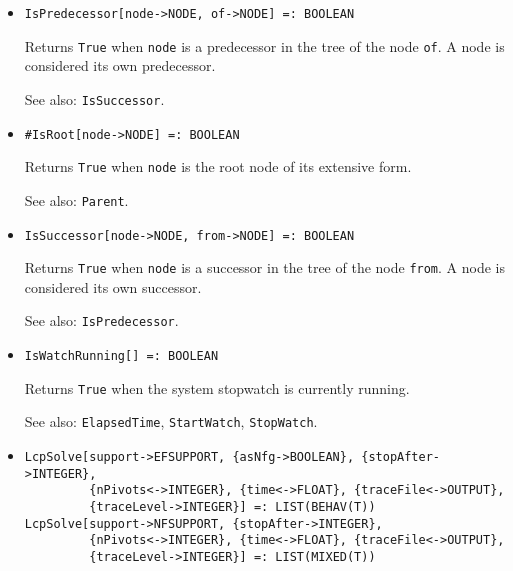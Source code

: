 \begin{itemize}
\item
\protect \large \begin{verbatim}
IsPredecessor[node->NODE, of->NODE] =: BOOLEAN
\end{verbatim}\normalsize

\bd
Returns \verb+True+ when \verb+node+ is a predecessor
in the tree of the node \verb+of+.  A node is considered its own predecessor.
\item [See also:] \verb+IsSuccessor+.
\ed

\item
\protect \large \begin{verbatim}
#IsRoot[node->NODE] =: BOOLEAN
\end{verbatim}\normalsize

\bd
Returns \verb+True+ when \verb+node+ is the root node of its
extensive form.
\item [See also:] \verb+Parent+.
\ed

\item
\protect \large \begin{verbatim}
IsSuccessor[node->NODE, from->NODE] =: BOOLEAN
\end{verbatim}\normalsize

\bd
Returns \verb+True+ when \verb+node+ is a successor
in the tree of the node \verb+from+.  A node is considered its own successor.
\item [See also:] \verb+IsPredecessor+.
\ed

\item
\protect \large \begin{verbatim}
IsWatchRunning[] =: BOOLEAN
\end{verbatim}\normalsize

\bd
Returns \verb+True+ when the system stopwatch is currently running.
\item
[See also:] \verb+ElapsedTime+, \verb+StartWatch+, \verb+StopWatch+.
\ed





\item
\protect \large \begin{verbatim}
LcpSolve[support->EFSUPPORT, {asNfg->BOOLEAN}, {stopAfter->INTEGER},
         {nPivots<->INTEGER}, {time<->FLOAT}, {traceFile<->OUTPUT},
         {traceLevel->INTEGER}] =: LIST(BEHAV(T))
LcpSolve[support->NFSUPPORT, {stopAfter->INTEGER},
         {nPivots<->INTEGER}, {time<->FLOAT}, {traceFile<->OUTPUT},
         {traceLevel->INTEGER}] =: LIST(MIXED(T))
\end{verbatim}\normalsize


\end{itemize}
